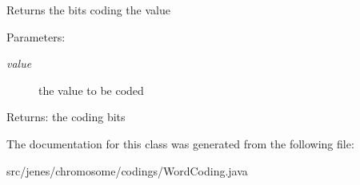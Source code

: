 Returns the bits coding the value

\begin{Desc}
\item[Parameters:]
\begin{description}
\item[{\em value}]the value to be coded \end{description}
\end{Desc}
\begin{Desc}
\item[Returns:]the coding bits \end{Desc}


The documentation for this class was generated from the following file:\begin{CompactItemize}
\item 
src/jenes/chromosome/codings/WordCoding.java\end{CompactItemize}
